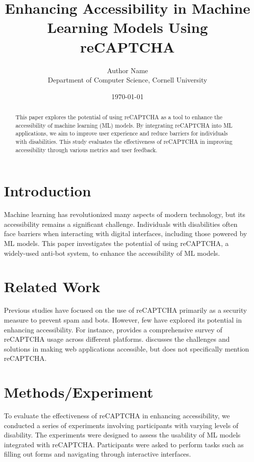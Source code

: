 \documentclass{article}
\title{Enhancing Accessibility in Machine Learning Models Using reCAPTCHA}
\author{Author Name\\
Department of Computer Science, Cornell University}
\date{\today}
\begin{document}
\maketitle

\begin{abstract}
This paper explores the potential of using reCAPTCHA as a tool to enhance the accessibility of machine learning (ML) models. By integrating reCAPTCHA into ML applications, we aim to improve user experience and reduce barriers for individuals with disabilities. This study evaluates the effectiveness of reCAPTCHA in improving accessibility through various metrics and user feedback.
\end{abstract}

\section{Introduction}
Machine learning has revolutionized many aspects of modern technology, but its accessibility remains a significant challenge. Individuals with disabilities often face barriers when interacting with digital interfaces, including those powered by ML models. This paper investigates the potential of using reCAPTCHA, a widely-used anti-bot system, to enhance the accessibility of ML models.

\section{Related Work}
Previous studies have focused on the use of reCAPTCHA primarily as a security measure to prevent spam and bots. However, few have explored its potential in enhancing accessibility. For instance, \cite{capcha_survey} provides a comprehensive survey of reCAPTCHA usage across different platforms. \cite{accessibility_survey} discusses the challenges and solutions in making web applications accessible, but does not specifically mention reCAPTCHA.

\section{Methods/Experiment}
To evaluate the effectiveness of reCAPTCHA in enhancing accessibility, we conducted a series of experiments involving participants with varying levels of disability. The experiments were designed to assess the usability of ML models integrated with reCAPTCHA. Participants were asked to perform tasks such as filling out forms and navigating through interactive interfaces.
\end{document}

